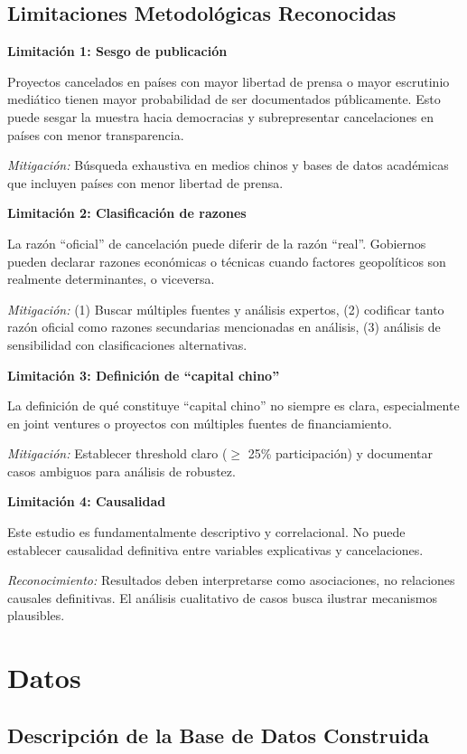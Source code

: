 \documentclass[12pt]{article}
\begin{document}
\subsection{Limitaciones Metodológicas Reconocidas}

\textbf{Limitación 1: Sesgo de publicación}

Proyectos cancelados en países con mayor libertad de prensa o mayor escrutinio mediático tienen mayor probabilidad de ser documentados públicamente. Esto puede sesgar la muestra hacia democracias y subrepresentar cancelaciones en países con menor transparencia.

\textit{Mitigación:} Búsqueda exhaustiva en medios chinos y bases de datos académicas que incluyen países con menor libertad de prensa.

\textbf{Limitación 2: Clasificación de razones}

La razón ``oficial'' de cancelación puede diferir de la razón ``real''. Gobiernos pueden declarar razones económicas o técnicas cuando factores geopolíticos son realmente determinantes, o viceversa.

\textit{Mitigación:} (1) Buscar múltiples fuentes y análisis expertos, (2) codificar tanto razón oficial como razones secundarias mencionadas en análisis, (3) análisis de sensibilidad con clasificaciones alternativas.

\textbf{Limitación 3: Definición de ``capital chino''}

La definición de qué constituye ``capital chino'' no siempre es clara, especialmente en joint ventures o proyectos con múltiples fuentes de financiamiento.

\textit{Mitigación:} Establecer threshold claro ($\geq$ 25\% participación) y documentar casos ambiguos para análisis de robustez.

\textbf{Limitación 4: Causalidad}

Este estudio es fundamentalmente descriptivo y correlacional. No puede establecer causalidad definitiva entre variables explicativas y cancelaciones.

\textit{Reconocimiento:} Resultados deben interpretarse como asociaciones, no relaciones causales definitivas. El análisis cualitativo de casos busca ilustrar mecanismos plausibles.

\section{Datos}

\subsection{Descripción de la Base de Datos Construida}
\end{document}
